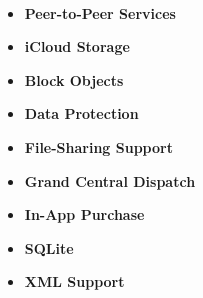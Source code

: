 \begin{description}
    \item[\parbox{\textwidth} {Die High Level Features dieses Layers sind}]~\par
	\begin{itemize}
		\item \textbf{Peer-to-Peer Services}
		\item \textbf{iCloud Storage}
		\item \textbf{Block Objects}
		\item \textbf{Data Protection}
		\item \textbf{File-Sharing Support}
		\item \textbf{Grand Central Dispatch}
		\item \textbf{In-App Purchase}
		\item \textbf{SQLite}
		\item \textbf{XML Support} 
	\end{itemize}
\end{description}


